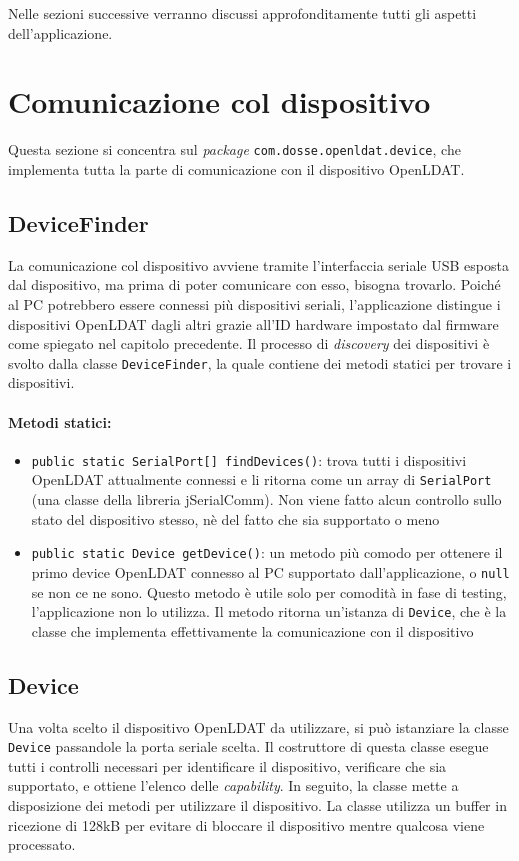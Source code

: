 Nelle sezioni successive verranno discussi approfonditamente tutti gli aspetti dell'applicazione.

\section{Comunicazione col dispositivo}
Questa sezione si concentra sul \textit{package} \texttt{com.dosse.openldat.device}, che implementa tutta la parte di comunicazione con il dispositivo OpenLDAT.

\subsection{DeviceFinder}
La comunicazione col dispositivo avviene tramite l'interfaccia seriale USB esposta dal dispositivo, ma prima di poter comunicare con esso, bisogna trovarlo. Poiché al PC potrebbero essere connessi più dispositivi seriali, l'applicazione distingue i dispositivi OpenLDAT dagli altri grazie all'ID hardware impostato dal firmware come spiegato nel capitolo precedente.
Il processo di \textit{discovery} dei dispositivi è svolto dalla classe \texttt{DeviceFinder}, la quale contiene dei metodi statici per trovare i dispositivi.

\paragraph{Metodi statici:}\begin{itemize}
	\item \texttt{public static SerialPort[] findDevices()}: trova tutti i dispositivi OpenLDAT attualmente connessi e li ritorna come un array di \texttt{SerialPort} (una classe della libreria jSerialComm). Non viene fatto alcun controllo sullo stato del dispositivo stesso, nè del fatto che sia supportato o meno
	\item \texttt{public static Device getDevice()}: un metodo più comodo per ottenere il primo device OpenLDAT connesso al PC supportato dall'applicazione, o \texttt{null} se non ce ne sono. Questo metodo è utile solo per comodità in fase di testing, l'applicazione non lo utilizza. Il metodo ritorna un'istanza di \texttt{Device}, che è la classe che implementa effettivamente la comunicazione con il dispositivo
\end{itemize}

\subsection{Device}
Una volta scelto il dispositivo OpenLDAT da utilizzare, si può istanziare la classe \texttt{Device} passandole la porta seriale scelta. Il costruttore di questa classe esegue tutti i controlli necessari per identificare il dispositivo, verificare che sia supportato, e ottiene l'elenco delle \textit{capability}. In seguito, la classe mette a disposizione dei metodi per utilizzare il dispositivo. La classe utilizza un buffer in ricezione di 128kB per evitare di bloccare il dispositivo mentre qualcosa viene processato.

